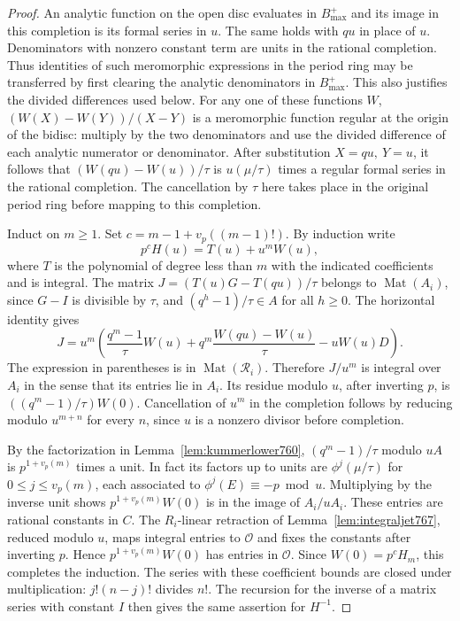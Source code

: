 \documentclass[a4paper,11pt]{article}
\theoremstyle{definition}
\theoremstyle{remark}
\numberwithin{equation}{section}
\begin{document}
\begin{proof}
An analytic function on the open disc evaluates in
\(B_{\max}^+\) and its image in this completion is its
formal series in \(u\). The same holds with \(qu\) in
place of \(u\). Denominators with nonzero constant term
are units in the rational completion. Thus identities of
such meromorphic expressions in the period ring may be
transferred by first clearing the analytic denominators in
\(B_{\max}^+\). This also justifies the divided differences
used below. For any one of these functions \(W\),
\((W(X)-W(Y))/(X-Y)\) is a meromorphic function regular
at the origin of the bidisc: multiply by the two
denominators and use the divided difference of each
analytic numerator or denominator. After substitution
\(X=qu,\ Y=u\), it follows that
\((W(qu)-W(u))/\tau\) is \(u(\mu/\tau)\) times a regular
formal series in the rational completion. The cancellation
by \(\tau\) here takes place in the original period ring
before mapping to this completion.

Induct on \(m\ge1\). Set \(c=m-1+v_p((m-1)!)\).
By induction write
\[
                  p^c H(u)=T(u)+u^m W(u),
\]
where \(T\) is the polynomial of degree less than \(m\)
with the indicated coefficients and is integral. The matrix
\(J=(T(u)G-T(qu))/\tau\) belongs to \(\operatorname{Mat}(A_i)\),
since \(G-I\) is divisible by \(\tau\), and
\((q^h-1)/\tau\in A\) for all \(h\ge0\).
The horizontal identity gives
\[
  J=u^m\left(
       \frac{q^m-1}{\tau}W(u)
       +q^m\frac{W(qu)-W(u)}{\tau}-uW(u)D
     \right).
\]
The expression in parentheses is in \(\operatorname{Mat}(\mathcal R_i)\).
Therefore \(J/u^m\) is integral over \(A_i\) in the sense
that its entries lie in \(A_i\). Its residue modulo \(u\),
after inverting \(p\), is \(((q^m-1)/\tau)W(0)\).
Cancellation of \(u^m\) in the completion follows by
reducing modulo \(u^{m+n}\) for every \(n\), since \(u\)
is a nonzero divisor before completion.

By the factorization in Lemma~\ref{lem:kummerlower760},
\((q^m-1)/\tau\) modulo \(u A\) is \(p^{1+v_p(m)}\)
times a unit. In fact its factors up to units are
\(\phi^j(\mu/\tau)\) for \(0\le j\le v_p(m)\),
each associated to \(\phi^j(E)\equiv-p\bmod u\).
Multiplying by the inverse unit shows
\(p^{1+v_p(m)}W(0)\) is in the image of \(A_i/u A_i\).
These entries are rational constants in \(C\). The
\(R_i\)-linear retraction of Lemma~\ref{lem:integraljet767},
reduced modulo \(u\), maps integral entries to \(\mathcal O\)
and fixes the constants after inverting \(p\). Hence
\(p^{1+v_p(m)}W(0)\) has entries in \(\mathcal O\).
Since \(W(0)=p^c H_m\), this completes the induction.
The series with these coefficient bounds are closed under
multiplication: \(j!(n-j)!\) divides \(n!\). The recursion
for the inverse of a matrix series with constant \(I\)
then gives the same assertion for \(H^{-1}\).
\end{proof}
\end{document}
